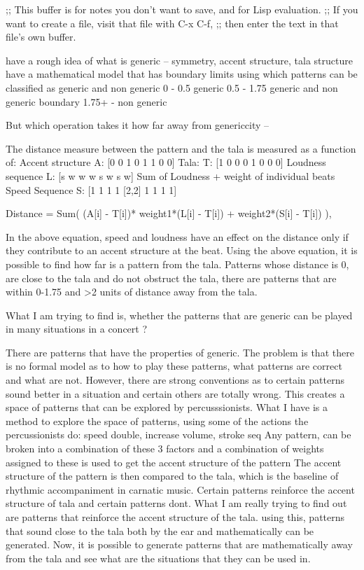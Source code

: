 ;; This buffer is for notes you don't want to save, and for Lisp evaluation.
;; If you want to create a file, visit that file with C-x C-f,
;; then enter the text in that file's own buffer.


have a rough idea of what is generic -- symmetry, accent structure, tala structure
have a mathematical model that has boundary limits using which patterns can be classified as generic and non generic
0 - 0.5  generic
0.5 - 1.75 generic and non generic boundary
1.75+ - non generic

But which operation takes it how far away from genericcity -- 

The distance measure between the pattern and the tala is measured as a function of:
Accent structure  A: [0 0 1 0 1 1 0 0]
Tala:             T: [1 0 0 0 1 0 0 0]
Loudness sequence L: [s w w w s w s w] {Sum of Loudness + weight of individual beats}
Speed Sequence    S: [1 1 1 1 [2,2] 1 1 1 1]

Distance = Sum( (A[i] - T[i])* { weight1*(L[i] - T[i]) + weight2*(S[i] - T[i]) } ),

In the above equation, speed and loudness have an effect on the distance only if they contribute to an accent structure at the beat. 
Using the above equation, it is possible to find how far is a pattern from the tala. Patterns whose distance is 0, are close to the tala and do not
obstruct the tala, there are patterns that are within 0-1.75 and >2 units of distance away from the tala. 

What I am trying to find is, whether the patterns that are generic can be played in many situations in a concert ?

There are patterns that have the properties of generic. The problem is that there is no formal model as to how to
play these patterns, what patterns are correct and what are not.
However, there are strong conventions as to certain patterns sound better in a situation and certain others
are totally wrong. This creates a space of patterns that can be explored by percusssionists.
What I have is a method to explore the space of patterns, using some of the actions the percussionists do: speed double, increase volume, stroke seq
Any pattern, can be broken into a combination of these 3 factors and a combination of weights assigned to these is used to get the accent structure of the pattern
The accent structure of the pattern is then compared to the tala, which is the baseline of rhythmic accompaniment in carnatic music.
Certain patterns reinforce the accent structure of tala and certain patterns dont.
What I am really trying to find out are patterns that reinforce the accent structure of the tala.
using this, patterns that sound close to the tala both by the ear and mathematically can be generated.
Now, it is possible to generate patterns that are mathematically away from the tala and see what are the situations
that they can be used in.

